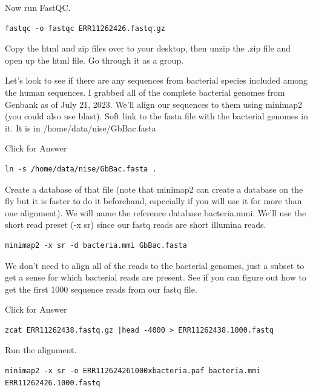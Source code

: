 \documentclass[
]{book}
\begin{document}
\hfill\break

Now run FastQC.

\begin{verbatim}
fastqc -o fastqc ERR11262426.fastq.gz
\end{verbatim}

Copy the html and zip files over to your desktop, then unzip the .zip file and open up the html file. Go through it as a group.

Let's look to see if there are any sequences from bacterial species included among the human sequences. I grabbed all of the complete bacterial genomes from Genbank as of July 21, 2023. We'll align our sequences to them using minimap2 (you could also use blast). Soft link to the fasta file with the bacterial genomes in it. It is in /home/data/nise/GbBac.fasta

Click for Answer

\begin{verbatim}
ln -s /home/data/nise/GbBac.fasta .
\end{verbatim}

\hfill\break

Create a database of that file (note that minimap2 can create a database on the fly but it is faster to do it beforehand, especially if you will use it for more than one alignment). We will name the reference database bacteria.mmi. We'll use the short read preset (-x sr) since our fastq reads are short illumina reads.

\begin{verbatim}
minimap2 -x sr -d bacteria.mmi GbBac.fasta
\end{verbatim}

We don't need to align all of the reads to the bacterial genomes, just a subset to get a sense for which bacterial reads are present. See if you can figure out how to get the first 1000 sequence reads from our fastq file.

Click for Answer

\begin{verbatim}
zcat ERR11262438.fastq.gz |head -4000 > ERR11262438.1000.fastq
\end{verbatim}

\hfill\break

Run the alignment.

\begin{verbatim}
minimap2 -x sr -o ERR112624261000xbacteria.paf bacteria.mmi ERR11262426.1000.fastq
\end{verbatim}
\end{document}
